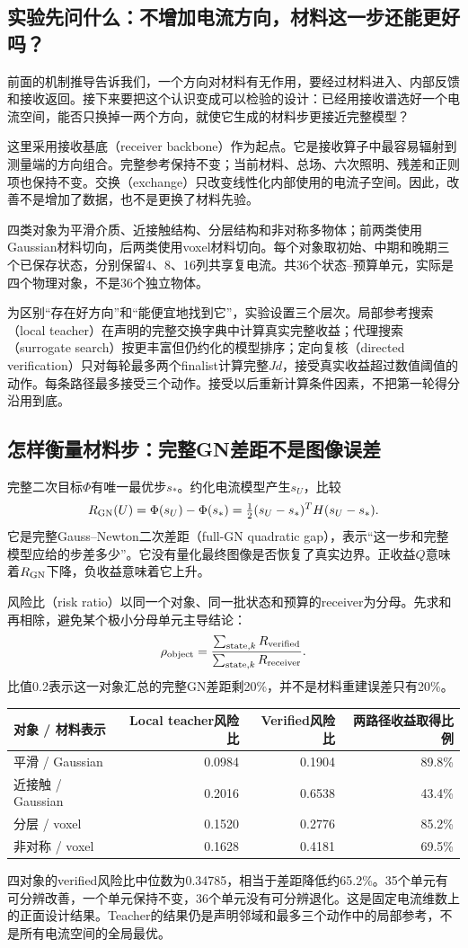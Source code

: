 
\subsection{实验先问什么：不增加电流方向，材料这一步还能更好吗？}
前面的机制推导告诉我们，一个方向对材料有无作用，要经过材料进入、内部反馈和接收返回。接下来要把这个认识变成可以检验的设计：已经用接收谱选好一个电流空间，能否只换掉一两个方向，就使它生成的材料步更接近完整模型？

这里采用接收基底（receiver backbone）作为起点。它是接收算子中最容易辐射到测量端的方向组合。完整参考保持不变；当前材料、总场、六次照明、残差和正则项也保持不变。交换（exchange）只改变线性化内部使用的电流子空间。因此，改善不是增加了数据，也不是更换了材料先验。

四类对象为平滑介质、近接触结构、分层结构和非对称多物体；前两类使用Gaussian材料切向，后两类使用voxel材料切向。每个对象取初始、中期和晚期三个已保存状态，分别保留4、8、16列共享复电流。共36个状态--预算单元，实际是四个物理对象，不是36个独立物体。

为区别“存在好方向”和“能便宜地找到它”，实验设置三个层次。局部参考搜索（local teacher）在声明的完整交换字典中计算真实完整收益；代理搜索（surrogate search）按更丰富但仍约化的模型排序；定向复核（directed verification）只对每轮最多两个finalist计算完整$Jd$，接受真实收益超过数值阈值的动作。每条路径最多接受三个动作。接受以后重新计算条件因素，不把第一轮得分沿用到底。

\subsection{怎样衡量材料步：完整GN差距不是图像误差}
完整二次目标$\Phi$有唯一最优步$s_*$。约化电流模型产生$s_U$，比较
\[
R_{\rm GN}(U)=\Phi(s_U)-\Phi(s_*)
=\tfrac12(s_U-s_*)^TH(s_U-s_*).
\]
它是完整Gauss--Newton二次差距（full-GN quadratic gap），表示“这一步和完整模型应给的步差多少”。它没有量化最终图像是否恢复了真实边界。正收益$Q$意味着$R_{\rm GN}$下降，负收益意味着它上升。

风险比（risk ratio）以同一个对象、同一批状态和预算的receiver为分母。先求和再相除，避免某个极小分母单元主导结论：
\[
\rho_{\rm object}=
\frac{\sum_{\mathrm{state},k}R_{\rm verified}}
{\sum_{\mathrm{state},k}R_{\rm receiver}}.
\]
比值0.2表示这一对象汇总的完整GN差距剩20\%，并不是材料重建误差只有20\%。

\begin{center}\small
\begin{tabular}{@{}lrrr@{}}\toprule
对象 / 材料表示&Local teacher风险比&Verified风险比&两路径收益取得比例\\\midrule
平滑 / Gaussian&0.0984&0.1904&89.8\%\\
近接触 / Gaussian&0.2016&0.6538&43.4\%\\
分层 / voxel&0.1520&0.2776&85.2\%\\
非对称 / voxel&0.1628&0.4181&69.5\%\\\bottomrule
\end{tabular}\end{center}
四对象的verified风险比中位数为0.34785，相当于差距降低约65.2\%。35个单元有可分辨改善，一个单元保持不变，36个单元没有可分辨退化。这是固定电流维数上的正面设计结果。Teacher的结果仍是声明邻域和最多三个动作中的局部参考，不是所有电流空间的全局最优。

